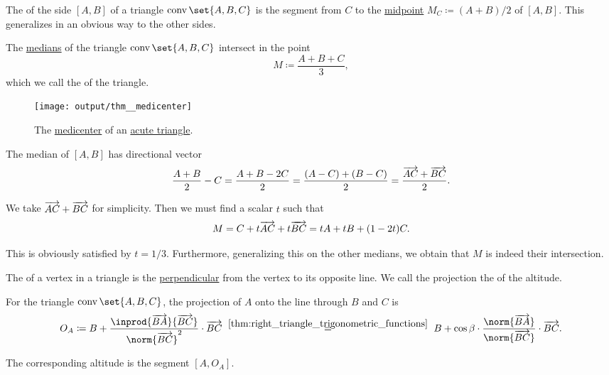 \begin{definition}\label{def:triangle_median}\mimprovised
  The  of the side \( [A, B] \) of a triangle \( \conv\set{ A, B, C } \) is the segment from \( C \) to the \hyperref[thm:segment_midpoint]{midpoint} \( M_C \coloneqq (A + B) / 2 \) of \( [A, B] \). This generalizes in an obvious way to the other sides.
\end{definition}

\begin{proposition}\label{thm:medicenter}
  The \hyperref[def:triangle_median]{medians} of the triangle \( \conv\set{ A, B, C } \) intersect in the point
  \begin{equation*}
    M \coloneqq \frac {A + B + C} 3,
  \end{equation*}
  which we call the  of the triangle.

  \begin{figure}[!ht]
    \centering
    \texttt{[image: output/thm\_\_medicenter]}
    \caption{The \hyperref[thm:medicenter]{medicenter} of an \hyperref[def:triangle/measure/acute]{acute triangle}.}\label{fig:thm:medicenter}
  \end{figure}
\end{proposition}
\begin{defproof}
  The median of \( [A, B] \) has directional vector
  \begin{equation*}
    \frac {A + B} 2 - C
    =
    \frac {A + B - 2C} 2
    =
    \frac {(A - C) + (B - C)} 2
    =
    \frac {\overrightarrow{AC} + \overrightarrow{BC}} 2.
  \end{equation*}

  We take \( \overrightarrow{AC} + \overrightarrow{BC} \) for simplicity. Then we must find a scalar \( t \) such that
  \begin{equation*}
    M = C + t \overrightarrow{AC} + t \overrightarrow{BC} = t A + t B + (1 - 2t) C.
  \end{equation*}

  This is obviously satisfied by \( t = 1 / 3 \). Furthermore, generalizing this on the other medians, we obtain that \( M \) is indeed their intersection.
\end{defproof}

\begin{definition}\label{def:triangle_altitude}
  The  of a vertex in a triangle is the \hyperref[def:perpendicularity]{perpendicular} from the vertex to its opposite line. We call the projection the  of the altitude.

  For the triangle \( \conv\set{ A, B, C } \), the projection of \( A \) onto the line through \( B \) and \( C \) is
  \begin{equation*}
    O_A
    \coloneqq
    B + \frac {\inprod {\vect{BA}} {\vect{BC}}} {\norm{\vect{BC}}^2} \cdot \vect{BC}
    \reloset {\ref{thm:right_triangle_trigonometric_functions}} =
    B + \cos \beta \cdot \frac {\norm{\vect{BA}}} {\norm{\vect{BC}}} \cdot \vect{BC}.
  \end{equation*}

  The corresponding altitude is the segment \( [A, O_A] \).
\end{definition}

